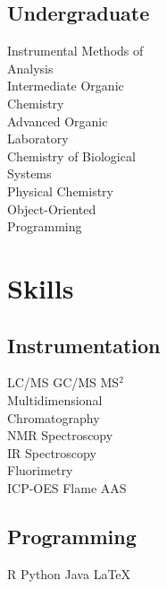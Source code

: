 \documentclass[]{deedy-resume-openfont}
\begin{document}
\begin{minipage}[t]{0.23\textwidth}
\subsection{Undergraduate}
Instrumental Methods of\\
\hspace*{2mm}Analysis \\
Intermediate Organic\\
\hspace*{2mm}Chemistry \\
Advanced Organic \\
\hspace*{2mm}Laboratory \\
Chemistry of Biological\\
\hspace*{2mm}Systems \\
Physical Chemistry \\
Object-Oriented\\
\hspace*{2mm}Programming \\
\sectionsep

\section{Skills}
\subsection{Instrumentation}
LC/MS \textbullet{} GC/MS \textbullet{} MS$^2$ \\
Multidimensional \\
\hspace*{2mm}Chromatography \\
NMR Spectroscopy \\ 
IR Spectroscopy \\
Fluorimetry \\
ICP-OES \textbullet{} Flame AAS
\sectionsep

\subsection{Programming}
R \textbullet{} Python \textbullet{} Java \textbullet{} \LaTeX\\
\sectionsep

%
%

\end{minipage}
\hfill
\end{document}
